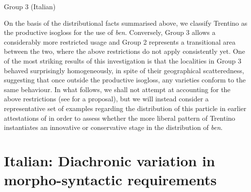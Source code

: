 \documentclass[output=paper]{langsci/langscibook}
\begin{document}
\ea\label{ex:key:12.6} Group 3 (Italian)\\
	\z
\z

On the basis of the distributional facts summarised above, we classify Trentino
as the productive isogloss for the use of \emph{ben}. Conversely, Group 3
allows a considerably more restricted usage and Group 2 represents a
transitional area between the two, where the above restrictions do not apply
consistently yet. One of the most striking results of this investigation is
that the localities in Group 3 behaved surprisingly homogeneously, in spite of
their geographical scatteredness, suggesting that once outside the productive
isogloss, any varieties conform to the same behaviour. In what follows, we
shall not attempt at accounting for the above restrictions (see
\citealt{CognSchi2018b,CognSchi2018} for a proposal), but we will instead
consider a representative set of examples regarding the distribution of this
particle in earlier attestations of  in order to assess whether
the more liberal pattern of Trentino instantiates an innovative or conservative
stage in the distribution of \emph{ben}.

\section{Italian: Diachronic variation in morpho-syntactic
requirements}\label{sec:23-diachronic}
\end{document}

